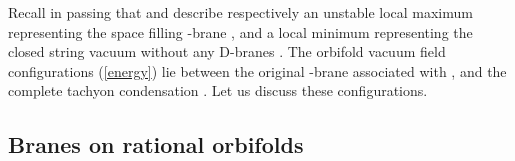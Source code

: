\documentclass[a4paper,12pt]{article}
\begin{document}
Recall in passing that \coordHE{} and \coordHE{} describe
respectively an unstable local maximum representing the space filling \coordHE{}%
-brane \coordHE{}, and a local minimum representing the closed
string vacuum without any D-branes \coordHE{}. The orbifold
vacuum field configurations (\ref{energy}) lie between the original \coordHE{}%
-brane associated with \coordHE{}  \coordHE{}, and the complete tachyon condensation
\coordHE{}. Let us discuss these configurations.

\subsection{Branes on rational orbifolds}
\end{document}
